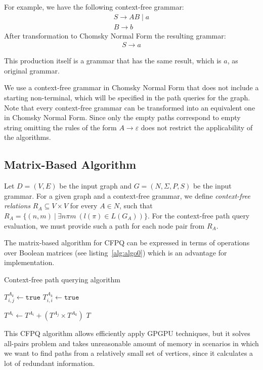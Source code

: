 For example, we have the following context-free grammar:
\begin{align*}
S \rightarrow AB \mid a \\
B \rightarrow b 
\end{align*}
After transformation to Chomsky Normal Form the resulting grammar:
\begin{align*}
S \rightarrow a
\end{align*}

This production itself is a grammar that has the same result, which is ${a}$, as original grammar.

We use a context-free grammar in Chomsky Normal Form that does not include a starting non-terminal, which will be specified in the path queries for the graph. Note that every context-free grammar can be transformed into an equivalent one in Chomsky Normal Form. Since only the empty paths correspond to empty string omitting the rules of the form \mbox{$A \rightarrow \varepsilon$} does not restrict the applicability of the algorithms.


\subsection{Matrix-Based Algorithm}

Let $D = (V, E)$ be the input graph and $G = (N, \Sigma, P, S)$ be the input grammar. For a given graph and a context-free grammar, we define \emph{context-free relations} \mbox{$R_A \subseteq V \times V$} for every \mbox{$A \in N$}, such that $R_A = \{(n,m)~|~\exists n \pi m~(l(\pi) \in L(G_A))\}$. For the context-free path query evaluation, we must provide such a path for each node pair from $R_A$.

The matrix-based algorithm for CFPQ can be expressed in terms of operations over Boolean matrices (see listing~\ref{alg:algo0}) which is an advantage for implementation.
{\footnotesize
\begin{algorithm}
\begin{algorithmic}[1]
\caption{Context-free path querying algorithm}
\label{alg:algo0}
          {$T^{A_k}_{i,j} \gets \texttt{true}$}
    \EndFor
            {$T^{A_k}_{i,i} \gets \texttt{true}$}
        \EndFor
    \EndFor

          { $T^{A_i} \gets T^{A_i} + (T^{A_j} \times T^{A_k})$ } 
        \EndFor
    \EndWhile
\State \Return $T$
\EndFunction
\end{algorithmic}
\end{algorithm}
}

This CFPQ algorithm allows efficiently apply GPGPU techniques, but it solves all-pairs problem and takes unreasonable amount of memory in scenarios in which we want to find paths from a relatively small set of vertices, since it calculates a lot of redundant information. 